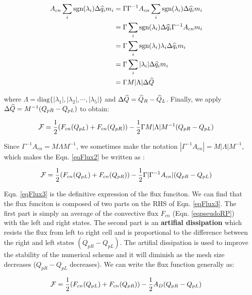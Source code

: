 \documentclass[12pt, letterpaper]{report}
\begin{document}
\begin{align*}
   A_{cn}\sum_i \textrm{sgn}(\lambda_i) \Delta \widehat{q}_i m_i &= \Gamma \Gamma^{-1} A_{cn} \sum_i
   \textrm{sgn}(\lambda_i) \Delta \widehat{q}_i m_i \\
   &= \Gamma \sum_i \textrm{sgn}(\lambda_i) \Delta \widehat{q}_i \Gamma^{-1} A_{cn} m_i \\
   &= \Gamma \sum_i \textrm{sgn}(\lambda_i) \lambda_i \Delta \widehat{q}_i m_i \\
   &= \Gamma \sum_i |\lambda_i| \Delta \widehat{q}_i m_i \\
   &= \Gamma M |\Lambda| \Delta \widehat{Q}
\end{align*}

where $\Lambda = \textrm{diag}\{|\lambda_1|, |\lambda_2|, \cdots, |\lambda_5|\}$ and $\Delta \widehat{Q} =
\widehat{Q}_R - \widehat{Q}_L$. Finally, we apply $\Delta \widehat{Q} = M^{-1}(Q_{pR} - Q_{pL})$ to obtain:

\begin{align}\label{eqFlux2}
   \mathcal{F} = \frac{1}{2}(F_{cn}(Q_{pL}) + F_{cn}(Q_{pR})) - \frac{1}{2}\Gamma M |\Lambda| M^{-1} (Q_{pR}
   - Q_{pL})
\end{align}

Since $\Gamma^{-1}A_{cn} = M \Lambda M^{-1}$, we sometimes make the notation $|\Gamma^{-1}A_{cn}| =
M |\Lambda| M^{-1}$, which makes the Eqn. \ref{eqFlux2} be written as \cite{li2006unified}:

\begin{align}\label{eqFlux3}
   \mathcal{F} = \frac{1}{2}(F_{cn}(Q_{pL}) + F_{cn}(Q_{pR})) - \frac{1}{2}\Gamma |\Gamma^{-1}A_{cn}| (Q_{pR}
   - Q_{pL})
\end{align}

Eqn. \ref{eqFlux3} is the definitive expression of the flux funciton. We can find that the flux
funciton is composed of two parts on the RHS of Eqn. \ref{eqFlux3}. The first part is simply an
average of the convective flux $F_{cn}$ (Eqn. \ref{eqpseudoRP}) with the left and right states. The
second part is an {\bf artifial dissipation} which resists the flux from left to right cell and is
proportional to the difference between the right and left states $(Q_{pR} -  Q_{pL})$. The artifial
dissipation is used to improve the stability of the numerical scheme and it will diminish as the
mesh size decreases ($Q_{pR} -  Q_{pL}$ decreases). We can write the flux function generally as:

\begin{align}\label{eqFluxAD}
   \mathcal{F} = \frac{1}{2}(F_{cn}(Q_{pL}) + F_{cn}(Q_{pR})) - \frac{1}{2}A_D (Q_{pR}
   - Q_{pL})
\end{align}
\end{document}
